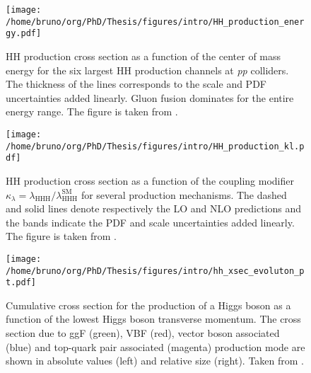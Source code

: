 \documentclass[11pt]{article}
\newcommand{\klrat}{\kappa_{\lambda} = \lambda_{\text{HHH}} / \lambda_{\text{HHH}}^{\text{SM}}}
\begin{document}
\begin{figure}[htbp]
\centering
\texttt{[image: /home/bruno/org/PhD/Thesis/figures/intro/HH\_production\_energy.pdf]}
\caption{\label{fig:HH_prod_energy}HH production cross section as a function of the center of mass energy for the six largest HH production channels at \emph{pp} colliders. The thickness of the lines corresponds to the scale and PDF uncertainties added linearly. Gluon fusion dominates for the entire energy range. The figure is taken from \cite{HH_xsec_running}.}
\end{figure}

\begin{figure}[htbp]
\centering
\texttt{[image: /home/bruno/org/PhD/Thesis/figures/intro/HH\_production\_kl.pdf]}
\caption{\label{fig:HH_prod_kl}HH production cross section as a function of the coupling modifier \(\klrat\) for several production mechanisms. The dashed and solid lines denote respectively the LO and NLO predictions and the bands indicate the PDF and scale uncertainties added linearly. The figure is taken from \cite{HH_xsec_running}.}
\end{figure}

\begin{figure}[htbp]
\centering
\texttt{[image: /home/bruno/org/PhD/Thesis/figures/intro/hh\_xsec\_evoluton\_pt.pdf]}
\caption{\label{fig:HH_prod_kl}Cumulative cross section for the production of a Higgs boson as a function of the lowest Higgs boson transverse momentum. The cross section due to \ac{ggF} (green), \ac{VBF} (red), vector boson associated (blue) and top-quark pair associated (magenta) production mode are shown in absolute values (left) and relative size (right). Taken from \cite{xsec_evolution_pt}.}
\end{figure}
\end{document}
